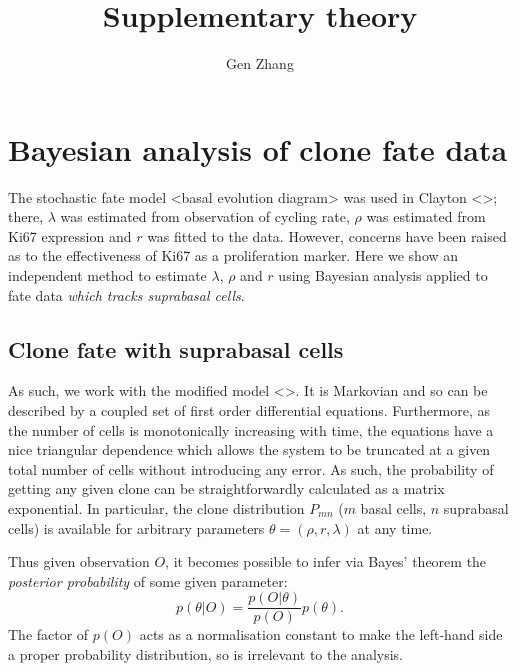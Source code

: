 \documentclass[10pt,UKenglish]{article}
\begin{document}
\title{Supplementary theory}
\author{Gen Zhang}
 
\maketitle

\section{Bayesian analysis of clone fate data}

The stochastic fate model <basal evolution diagram> was used in Clayton <>; there, $\lambda$ was estimated from observation of cycling rate, $\rho$ was estimated from Ki67 expression and $r$ was fitted to the data. However, concerns have been raised as to the effectiveness of Ki67 as a proliferation marker. Here we show an independent method to estimate $\lambda$, $\rho$ and $r$ using Bayesian analysis applied to fate data \emph{which tracks suprabasal cells}.

\subsection{Clone fate with suprabasal cells}

As such, we work with the modified model <>. It is Markovian and so can be described by a coupled set of first order differential equations. Furthermore, as the number of cells is monotonically increasing with time, the equations have a nice triangular dependence which allows the system to be truncated at a given total number of cells without introducing any error. As such, the probability of getting any given clone can be straightforwardly calculated as a matrix exponential. In particular, the clone distribution $P_{mn}$ ($m$ basal cells, $n$ suprabasal cells) is available for arbitrary parameters $\theta = (\rho, r, \lambda)$ at any time.

Thus given observation $O$, it becomes possible to infer via Bayes' theorem the \emph{posterior probability} of some given parameter: $$p(\theta|O) = \frac{p(O|\theta)}{p(O)} p(\theta).$$ The factor of $p(O)$ acts as a normalisation constant to make the left-hand side a proper probability distribution, so is irrelevant to the analysis. 
\end{document}
